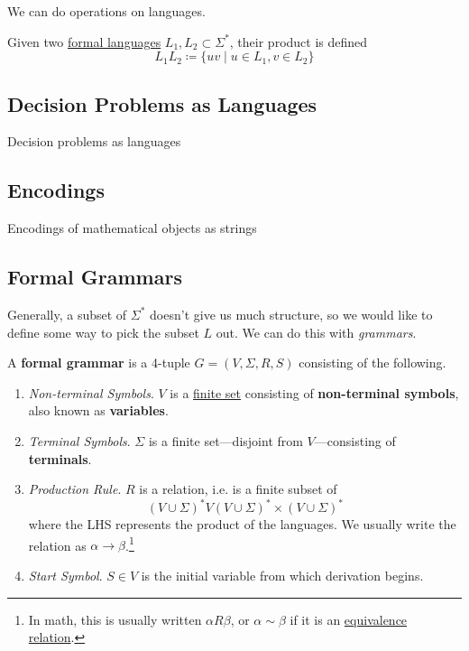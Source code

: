 	We can do operations on languages. 

  \begin{definition}
    \label{def:product-of-formal-languages}
    Given two \hyperref[def:formal-language]{formal languages} $L_1, L_2 \subset \Sigma^\ast$, their product is defined 
    \begin{equation}
      L_1 L_2 \coloneqq \{ uv \mid u \in L_1, v \in L_2 \}
    \end{equation}
  \end{definition}

\subsection{Decision Problems as Languages}

	Decision problems as languages

\subsection{Encodings}

	Encodings of mathematical objects as strings

\subsection{Formal Grammars}

  Generally, a subset of $\Sigma^\ast$ doesn't give us much structure, so we would like to define some way to pick the subset $L$ out. We can do this with \textit{grammars}. 

  \begin{definition}
    \label{def:formal-grammar}
    A \textbf{formal grammar} is a 4-tuple $G = (V, \Sigma, R, S)$ consisting of the following. 
    \begin{enumerate}
      \item \textit{Non-terminal Symbols}. $V$ is a \hyperref[st-def:finite-set]{finite set} consisting of \textbf{non-terminal symbols}, also known as \textbf{variables}. 
      \item \textit{Terminal Symbols}. $\Sigma$ is a finite set---disjoint from $V$---consisting of \textbf{terminals}. 
      \item \textit{Production Rule}. $R$ is a relation, i.e. is a finite subset of 
        \begin{equation}
          (V \cup \Sigma)^\ast V (V \cup \Sigma)^\ast \times (V \cup \Sigma)^\ast
        \end{equation}
        where the LHS represents the product of the languages. We usually write the relation as $\alpha \to \beta$.\footnote{In math, this is usually written $\alpha R \beta$, or $\alpha \sim \beta$ if it is an \hyperref[st-def:equivalence_relation]{equivalence relation}.}

      \item \textit{Start Symbol}. $S \in V$ is the initial variable from which derivation begins. 
    \end{enumerate}
  \end{definition}

